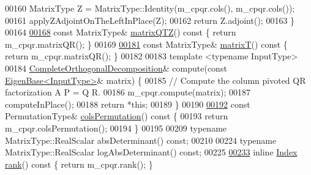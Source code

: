 \begin{DoxyCode}
00160     MatrixType Z = MatrixType::Identity(m\_cpqr.cols(), m\_cpqr.cols());
00161     applyZAdjointOnTheLeftInPlace(Z);
00162     \textcolor{keywordflow}{return} Z.adjoint();
00163   \}
00164 
\hyperlink{group___q_r___module_ad89e2529fc1a8721239d9b6be9613a69}{00168}   \textcolor{keyword}{const} MatrixType& \hyperlink{group___q_r___module_ad89e2529fc1a8721239d9b6be9613a69}{matrixQTZ}()\textcolor{keyword}{ const }\{ \textcolor{keywordflow}{return} m\_cpqr.matrixQR(); \}
00169 
\hyperlink{group___q_r___module_a806213f5c96ff765265f47067229586d}{00181}   \textcolor{keyword}{const} MatrixType& \hyperlink{group___q_r___module_a806213f5c96ff765265f47067229586d}{matrixT}()\textcolor{keyword}{ const }\{ \textcolor{keywordflow}{return} m\_cpqr.matrixQR(); \}
00182 
00183   \textcolor{keyword}{template} <\textcolor{keyword}{typename} InputType>
00184   \hyperlink{group___q_r___module_class_eigen_1_1_complete_orthogonal_decomposition}{CompleteOrthogonalDecomposition}& compute(\textcolor{keyword}{const} 
      \hyperlink{group___core___module_struct_eigen_1_1_eigen_base}{EigenBase<InputType>}& matrix) \{
00185     \textcolor{comment}{// Compute the column pivoted QR factorization A P = Q R.}
00186     m\_cpqr.compute(matrix);
00187     computeInPlace();
00188     \textcolor{keywordflow}{return} *\textcolor{keyword}{this};
00189   \}
00190 
\hyperlink{group___q_r___module_a601c67a4a0bbe9c7b25b885279db9ff2}{00192}   \textcolor{keyword}{const} PermutationType& \hyperlink{group___q_r___module_a601c67a4a0bbe9c7b25b885279db9ff2}{colsPermutation}()\textcolor{keyword}{ const }\{
00193     \textcolor{keywordflow}{return} m\_cpqr.colsPermutation();
00194   \}
00195 
00209   \textcolor{keyword}{typename} MatrixType::RealScalar absDeterminant() \textcolor{keyword}{const};
00210 
00224   \textcolor{keyword}{typename} MatrixType::RealScalar logAbsDeterminant() \textcolor{keyword}{const};
00225 
\hyperlink{group___q_r___module_af348f64b26f8467a020062c22b748806}{00233}   \textcolor{keyword}{inline} \hyperlink{namespace_eigen_a62e77e0933482dafde8fe197d9a2cfde}{Index} \hyperlink{group___q_r___module_af348f64b26f8467a020062c22b748806}{rank}()\textcolor{keyword}{ const }\{ \textcolor{keywordflow}{return} m\_cpqr.rank(); \}

\end{DoxyCode}
